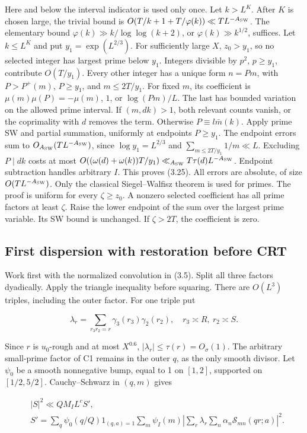 Here and below the interval indicator is used only once.
Let $k>L^K$. After $K$ is chosen large, the trivial bound is
$O(T/k+1+T/\varphi(k))\ll TL^{-A_{\rm SW}}$.
The elementary bound $\varphi(k)\gg k/\log\log(k+2)$, or
$\varphi(k)\gg k^{1/2}$, suffices.
Let $k\le L^K$ and put $y_1=\exp(L^{2/3})$.
For sufficiently large $X$, $z_0>y_1$, so no selected integer
has largest prime below $y_1$.
Integers divisible by $p^2$, $p\ge y_1$, contribute $O(T/y_1)$.
Every other integer has a unique form $n=Pm$, with $P>P^+(m)$, $P\ge y_1$,
and $m\le2T/y_1$. For fixed $m$, its coefficient is
$\mu(m)\mu(P)=-\mu(m)$, $1$, or $\log(Pm)/L$.
The last has bounded variation on the allowed prime interval.
If $(m,dk)>1$, both relevant counts vanish,
or the coprimality with $d$ removes the term.
Otherwise $P\equiv l\bar m(k)$.
Apply prime SW and partial summation, uniformly at endpoints $P\ge y_1$.
The endpoint errors sum to $O_{A_{\rm SW}}(TL^{-A_{\rm SW}})$, since
$\log y_1=L^{2/3}$ and $\sum_{m\le2T/y_1}1/m\ll L$.
Excluding $P\mid dk$ costs at most
$O((\omega(d)+\omega(k))T/y_1)\ll_{A_{\rm SW}} T\tau(d)L^{-A_{\rm SW}}$.
Endpoint subtraction handles arbitrary $I$. This proves (3.25).
All errors are absolute, of size $O(TL^{-A_{\rm SW}})$.
Only the classical Siegel--Walfisz theorem is used for primes.
The proof is uniform for every $\zeta\ge z_0$.
A nonzero selected coefficient has all prime factors at least $\zeta$.
Raise the lower endpoint of the sum over the largest prime variable.
Its SW bound is unchanged. If $\zeta>2T$, the coefficient is zero.

\subsection{First dispersion with restoration before CRT}

Work first with the normalized convolution in (3.5).
Split all three factors dyadically.
Apply the triangle inequality before squaring.
There are $O(L^3)$ triples, including the outer factor. For one triple put

\[
\lambda_r=\sum_{r_3r_2=r}\gamma_3(r_3)\gamma_2(r_2),
\quad r_3\asymp R,\ r_2\asymp S.
\tag{3.26}
\]

Since $r$ is $u_0$-rough and at most $X^{0.6}$,
$|\lambda_r|\le\tau(r)=O_\sigma(1)$. The arbitrary small-prime factor
of C1 remains in the outer $q$, as the only smooth divisor.
Let $\psi_0$ be a smooth nonnegative bump, equal to 1 on $[1,2]$,
supported on $[1/2,5/2]$. Cauchy--Schwarz in $(q,m)$ gives

\[
\begin{aligned}
&|S|^2\ll QM_IL^c S',\quad\\
&S'=\sum_q\psi_0(q/Q)1_{(q,a)=1}\sum_m\psi_I(m)
 \left|\sum_r\lambda_r\sum_n\alpha_n\mathcal S_{mn}(qr;a)\right|^2.
\end{aligned}
\tag{3.27}
\]

